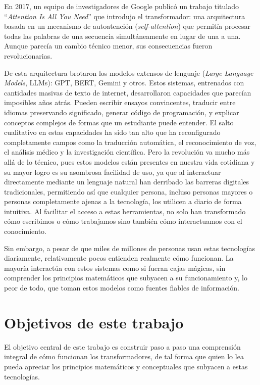 En 2017, un equipo de investigadores de Google publicó un trabajo titulado ``\textit{Attention Is All You Need}''
que introdujo el transformador: una arquitectura basada en un mecanismo de autoatención (\textit{self-attention}) 
que permitía procesar todas las palabras de una secuencia simultáneamente en lugar de una a una. 
Aunque parecía un cambio técnico menor, sus consecuencias fueron revolucionarias.

De esta arquitectura brotaron los modelos extensos de lenguaje (\textit{Large Language Models}, LLMs): GPT, BERT,
Gemini y otros. Estos sistemas, entrenados con cantidades masivas de texto de internet, desarrollaron capacidades
que parecían imposibles años atrás. Pueden escribir ensayos convincentes, traducir entre idiomas preservando
significado, generar código de programación, y explicar conceptos complejos de formas que un estudiante puede 
entender. El salto cualitativo en estas capacidades ha sido tan alto que ha reconfigurado completamente campos 
como la traducción automática, el reconocimiento de voz, el análisis médico y la investigación científica. 
Pero la revolución va mucho más allá de lo técnico, pues estos modelos están presentes en nuestra vida cotidiana y 
su mayor logro es su asombrosa facilidad de uso, ya que al interactuar directamente mediante un lenguaje natural 
han derribado las barreras digitales tradicionales, permitiendo así que cualquier persona, incluso personas 
mayores o personas completamente ajenas a la tecnología, los utilicen a diario de forma intuitiva. 
Al facilitar el acceso a estas herramientas, no solo han transformado cómo escribimos o cómo trabajamos sino también
cómo interactuamos con el conocimiento.

Sin embargo, a pesar de que miles de millones de personas usan estas tecnologías diariamente, relativamente pocos 
entienden realmente cómo funcionan. La mayoría interactúa con estos sistemas como
si fueran cajas mágicas, sin comprender los principios matemáticos que subyacen a su funcionamiento y, lo peor de todo, que toman
estos modelos como fuentes fiables de información.

\section{Objetivos de este trabajo}

El objetivo central de este trabajo es construir paso a paso una comprensión integral de cómo funcionan los 
transformadores, de tal forma que quien lo lea pueda apreciar los principios matemáticos y conceptuales que subyacen 
a estas tecnologías.

